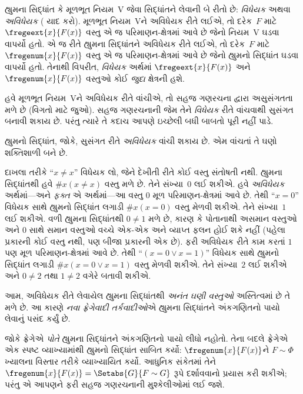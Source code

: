 હ્યુમના સિદ્ધાંત કે મૂળભૂત નિયમ~V જેવા સિદ્ધાંતને
લેવાની બે રીતો છે: \emph{વિધેયક} અથવા
\emph{અવિધેયક} (
યાદ કરો). મૂળભૂત નિયમ~Vને અવિધેયક રીતે લઈએ,
તો દરેક~$F$ માટે $\fregeext{x}{F(x)}$ વસ્તુ
એ જ પરિમાણન-ક્ષેત્રમાં આવે છે જેનો નિયમ~V
ઘડવા વાપર્યો હતો. એ જ રીતે હ્યુમના સિદ્ધાંતને
અવિધેયક રીતે લઈએ, તો દરેક~$F$ માટે
$\fregenum{x}{F(x)}$ વસ્તુ એ જ પરિમાણન-ક્ષેત્રમાં
આવે છે જેનો હ્યુમનો સિદ્ધાંત ઘડવા વાપર્યો હતો.
તેનાથી વિપરીત, \emph{વિધેયક} અર્થમાં
$\fregeext{x}{F(x)}$ અને~$\fregenum{x}{F(x)}$
વસ્તુઓ કોઈ \emph{જુદા} ક્ષેત્રની હશે.

હવે મૂળભૂત નિયમ~Vને અવિધેયક રીતે વાંચીએ, તો
સહજ ગણરચના દ્વારા અસુસંગતતા મળે છે
(વિગતો માટે  જુઓ).
સહજ ગણરચનાની જેમ તેને \emph{વિધેયક} રીતે
વાંચવાથી સુસંગત બનાવી શકાય છે. પરંતુ ત્યારે તે
કદાચ આપણે ઇચ્છેલી બધી બાબતો પૂરી નહીં પાડે.

હ્યુમનો સિદ્ધાંત, જોકે, સુસંગત રીતે
\emph{અવિધેયક} વાંચી શકાય છે. એમ વાંચતાં તે
ઘણો શક્તિશાળી બને છે.

દાખલા તરીકે ``$x \neq x$'' વિધેયક લો, જેને
દેખીતી રીતે કોઈ વસ્તુ સંતોષતી નથી. હ્યુમના
સિદ્ધાંતથી હવે $\# x( x\neq x)$ વસ્તુ મળે છે.
તેને સંખ્યા~$0$ લઈ શકીએ. હવે \emph{અવિધેયક}
અર્થમાં---અને \emph{ફક્ત} એ અર્થમાં---આ વસ્તુ
$0$ મૂળ પરિમાણન-ક્ષેત્રમાં આવે છે. તેથી
``$x = 0$'' વિધેયક સાથે હ્યુમનો સિદ્ધાંત લગાડી
$\#x (x = 0)$ વસ્તુ મેળવી શકીએ. તેને સંખ્યા~$1$
લઈ શકીએ. વળી હ્યુમના સિદ્ધાંતથી $0 \neq 1$
મળે છે, કારણ કે પોતાનાથી અસમાન વસ્તુઓ અને $0$
સાથે સમાન વસ્તુઓ વચ્ચે એક-એક અને વ્યાપ્ત ફલન
હોઈ શકે નહીં (પહેલા પ્રકારની કોઈ વસ્તુ નથી, પણ
બીજા પ્રકારની એક છે). ફરી અવિધેયક રીતે કામ કરતાં
$1$ પણ મૂળ પરિમાણન-ક્ષેત્રમાં આવે છે. તેથી
``$(x = 0 \lor x = 1)$'' વિધેયક સાથે હ્યુમનો
સિદ્ધાંત લગાડી $\#x(x = 0 \lor x = 1)$ વસ્તુ
મેળવી શકીએ. તેને સંખ્યા~$2$ લઈ શકીએ અને
$0\neq 2$ તથા $1 \neq 2$ વગેરે બતાવી શકીએ.

આમ, અવિધેયક રીતે લેવાયેલ હ્યુમના સિદ્ધાંતથી
\emph{અનંત ઘણી વસ્તુઓ} અસ્તિત્વમાં છે તે મળે છે.
આ કારણે \emph{નવા ફ્રેગેવાદી તર્કવાદીઓ}એ
હ્યુમના સિદ્ધાંતને અંકગણિતનો પાયો લેવાનું પસંદ કર્યું છે.

જોકે ફ્રેગેએ \emph{પોતે} હ્યુમના સિદ્ધાંતને
અંકગણિતનો પાયો લીધો નહોતો. તેના બદલે ફ્રેગેએ
એક સ્પષ્ટ વ્યાખ્યામાંથી હ્યુમનો સિદ્ધાંત સાબિત
કર્યો: $\fregenum{x}{F(x)}$ને $F \sim \Phi$
ખ્યાલના વિસ્તાર તરીકે વ્યાખ્યાયિત કર્યો.
આધુનિક સંકેતમાં તેને
$\fregenum{x}{F(x)} = \Setabs{G}{F \sim G}$
રૂપે દર્શાવવાનો પ્રયાસ કરી શકીએ; પરંતુ એ આપણને
ફરી સહજ ગણરચનાની મુશ્કેલીઓમાં લઈ જશે.
\endgroup


\OLEndChapterHook
\endgroup


